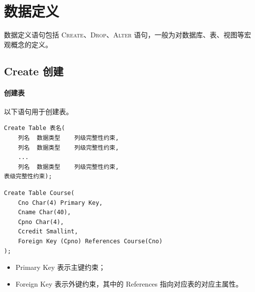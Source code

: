 \documentclass[UTF8]{ctexart}
\newcommand\kw[1]{\textsc{#1}} %
\begin{document}
\newpage
{}
\BgThispage
\section{数据定义}
数据定义语句包括 \kw{Create}、\kw{Drop}、\kw{Alter} 语句，一般为对数据库、表、视图等宏观概念的定义。

\subsection{Create 创建}

\paragraph{创建表}
以下语句用于创建表。
\begin{lstlisting}
Create Table 表名(
    列名  数据类型    列级完整性约束,
    列名  数据类型    列级完整性约束,
    ...
    列名  数据类型    列级完整性约束,
表级完整性约束);
\end{lstlisting}

\begin{lstlisting}[backgroundcolor=\color{white}]
Create Table Course(
    Cno Char(4) Primary Key,
    Cname Char(40),
    Cpno Char(4),
    Ccredit Smallint,
    Foreign Key (Cpno) References Course(Cno)
);
\end{lstlisting}
\begin{itemize}
    \item Primary Key 表示主键约束；
    \item Foreign Key 表示外键约束，其中的 References 指向对应表的对应主属性。
\end{itemize}
\end{document}
